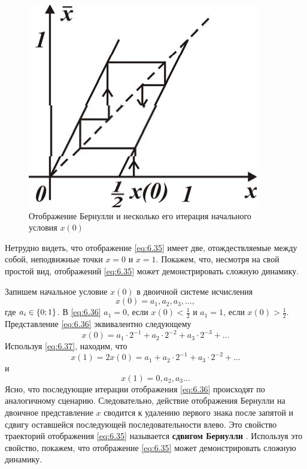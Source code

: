 \begin{figure}[h]
        \centering
        \includegraphics[width=0.6\linewidth]{fig/lect6/6}
        \caption{Отображение Бернулли и несколько его итерация начального условия $x(0)$}
        \label{fig:6.6}
\end{figure}
Нетрудно видеть, что отображение \eqref{eq:6.35} имеет две, отождествляемые между собой, неподвижные точки $x=0$ и $x=1$.
Покажем, что, несмотря на свой простой вид, отображений \eqref{eq:6.35} может демонстрировать сложную динамику.

Запишем начальное условие $x(0)$ в двоичной системе исчисления 
\begin{equation}
        \label{eq:6.36}
        x(0) = a_1,a_2,a_3,\dots,
\end{equation}
где $a_i \in \qty{0;1}$. В \eqref{eq:6.36} $a_1=0$, если $x(0) < \frac{1}{2}$ и
$a_1=1$, если $x(0) > \frac{1}{2}$.
Представление \eqref{eq:6.36} эквивалентно следующему
\begin{equation}
        \label{eq:6.37}
        x(0) = a_1 \cdot 2^{-1} + a_2 \cdot 2^{-2} + a_3\cdot 2^{-3}+\dots
\end{equation}
Используя \eqref{eq:6.37}, находим, что
\begin{equation}
        \label{eq:6.38}
        x(1) = 2x(0)= a_1 + a_2 \cdot 2^{-1}+a_3 \cdot 2^{-2}+ \dots
\end{equation}
и
\begin{equation}
        \label{eq:6.39}
        x(1) = 0, a_2,a_3\dots
\end{equation}
Ясно, что последующие итерации отображения \eqref{eq:6.36}  происходят по
аналогичному сценарию. Следовательно, действие отображения Бернулли на
двоичное представление $x$ сводится к удалению первого знака после запятой и
сдвигу оставшейся последующей последовательности влево. Это свойство
траекторий отображения \eqref{eq:6.35} называется \textbf{сдвигом Бернулли }. Используя это
свойство, покажем, что отображение \eqref{eq:6.35} может демонстрировать сложную
динамику.

